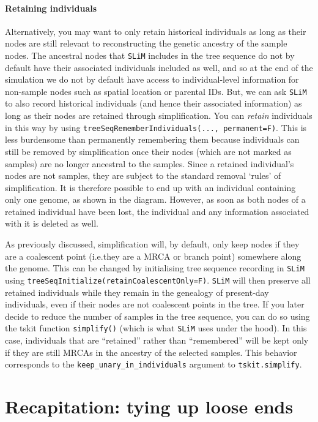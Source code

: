 \documentclass[12pt]{article}
\newcommand{\slim}[0]{\texttt{SLiM}\xspace}
\newcommand*{\ie}{i.e.\xcomma}
\begin{document}
\paragraph{Retaining individuals}
Alternatively, you may want to only retain historical individuals as long as their nodes are still
relevant to reconstructing the genetic ancestry of the sample nodes.
The ancestral nodes that \slim includes in the tree sequence do not by default have their associated individuals included as well,
and so at the end of the simulation we do not by default have access to individual-level information for non-sample nodes
such as spatial location or parental IDs.
But, we can ask \slim to also record historical individuals (and hence their associated information)
as long as their nodes are retained through simplification.
You can \emph{retain} individuals in this way by using
\verb|treeSeqRememberIndividuals(..., permanent=F)|.
This is less burdensome than permanently remembering them because individuals can still be removed by simplification
once their nodes (which are not marked as samples) are no longer ancestral to the samples.
Since a retained individual's nodes are not samples,
they are subject to the standard removal `rules' of simplification.
It is therefore possible to end up with an individual containing only one genome, as shown in the diagram.
However, as soon as both nodes of a retained individual have been lost,
the individual and any information associated with it is deleted as well.

As previously discussed, simplification will, by default, only keep nodes if they are a coalescent point
(\ie they are a MRCA or branch point) somewhere along the genome.
This can be changed by initialising tree sequence recording in \slim using
\verb|treeSeqInitialize(retainCoalescentOnly=F)|.
\slim will then preserve all retained individuals while they remain in the genealogy of present-day individuals,
even if their nodes are not coalescent points in the tree.
If you later decide to reduce the number
of samples in the tree sequence, you can do so using the tskit function \verb|simplify()|
(which is what \slim uses under the hood).
In this case, individuals that are ``retained'' rather than ``remembered'' will be kept only
if they are still MRCAs in the ancestry of the selected samples.
This behavior corresponds to the
\verb|keep_unary_in_individuals| argument to \verb|tskit.simplify|.

\section{Recapitation: tying up loose ends} %
\end{document}
